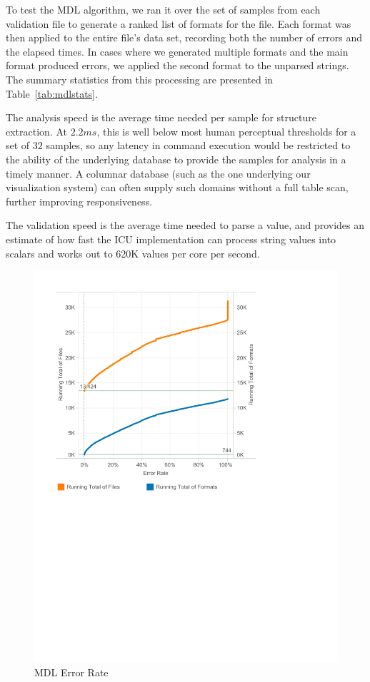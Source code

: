 To test the MDL algorithm, we ran it over the set of samples from each validation file to generate a ranked list of formats for the file. Each format was then applied to the entire file's data set, recording both the number of errors and the elapsed times. In cases where we generated multiple formats and the main format produced errors, we applied the second format to the unparsed strings. The summary statistics from this processing are presented in Table~\ref{tab:mdlstats}.

The analysis speed is the average time needed per sample for structure extraction. 
At $2.2ms$, this is well below most human perceptual thresholds for a set of $32$ samples, so any latency in command execution would be restricted to the ability of the underlying database to provide the samples for analysis in a timely manner. 
A columnar database (such as the one underlying our visualization system) can often supply such domains without a full table scan, further improving responsiveness.

The validation speed is the average time needed to parse a value, and provides an estimate of how fast the ICU implementation can process string values into scalars and works out to 620K values per core per second.
 
\begin{figure}[ht]
\centering
\includegraphics[width=\columnwidth]{figures/FigureM2}
\caption{MDL Error Rate}
\label{fig:mdlerror}
\end{figure}

